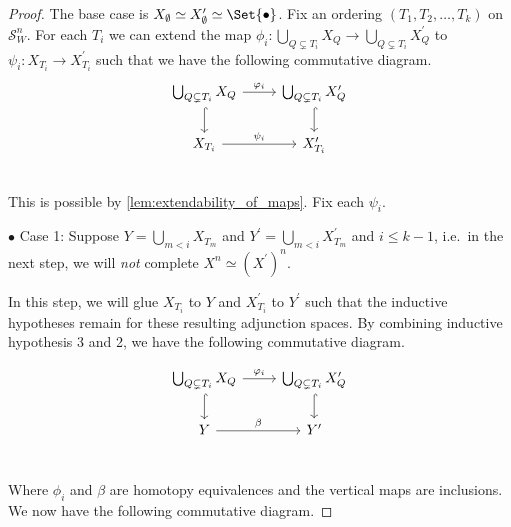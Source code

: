 \documentclass[class=article, crop=false]{standalone}
\begin{document}
\begin{proof}
    The base case is $X_\emptyset \simeq X^\prime_\emptyset \simeq \Set{\bullet}$.
    Fix an ordering $(T_1, T_2, \ldots , T_k)$ on $\mathcal{S}^n_W$.
    For each $T_i$ we can extend the map $\phi_i \colon \bigcup_{Q \subsetneq T_i} X_{Q} \to \bigcup_{Q \subsetneq T_i} X^\prime_{Q}$ to $\psi_i \colon X_{T_i} \to X^\prime_{T_i}$ such that we have the following commutative diagram.
    \begin{equation*}
        \begin{tikzcd}
\bigcup_{Q \subsetneq T_i} X_{Q}  \ar[r, "\phi_i"]             &   \bigcup_{Q \subsetneq T_i} X^\prime_{Q}                                  \\
X_{T_i} \ar[r, "\psi_i" ] \ar[from = u, hookrightarrow]                                  &   X^\prime_{T_i}  \ar[from = u, hookrightarrow]      \\
        \end{tikzcd}
    \end{equation*}
    This is possible by \cref{lem:extendability_of_maps}. Fix each $\psi_i$.

    $\bullet$ Case 1: Suppose $Y = \bigcup_{m < i} X_{T_m}$ and $Y^\prime = \bigcup_{m < i} X^\prime_{T_m}$ and $i\leq k-1$, i.e.~in the next step, we will \emph{not} complete $X^n \simeq (X^\prime)^n$.

    In this step, we will glue $X_{T_{i}}$ to $Y$ and $X^\prime_{T_{i}}$ to $Y^\prime$ such that the inductive hypotheses remain for these resulting adjunction spaces.
    By combining inductive hypothesis 3 and 2, we have the following commutative diagram.

    \begin{equation*}
        \begin{tikzcd}
\bigcup_{Q \subsetneq T_i} X_{Q} \ar[r, "\phi_i" ] \ar[d, hookrightarrow]     &   \bigcup_{Q \subsetneq T_i} X^\prime_{Q}  \ar[d, hookrightarrow]       \\
Y  \ar[r, "\beta"]                                                                 &   Y^\prime                                                  \\
        \end{tikzcd}
        \label{eqn:commutative_Y_inductive_hyp}  
    \end{equation*}

    Where $\phi_i$ and $\beta$ are homotopy equivalences and the vertical maps are inclusions. We now have the following commutative diagram.


\end{proof}
\end{document}
